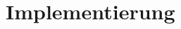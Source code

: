 
\chapter{Implementierung}
\label{ch:Implementierung}

\label{ch:Implementierung:sec:Signal}






%


